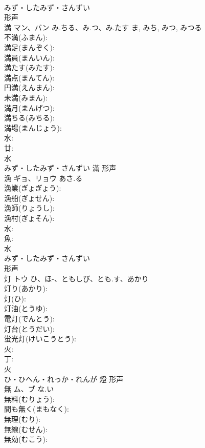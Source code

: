 \documentclass[8pt]{extreport}
\begin{document}
\begin{CJK}{UTF8}{min}
\\	みず・したみず・さんずい	
\\	形声 
\\	満	マン、バン	み.ちる、み.つ、み.たす	ま, みち, みつ, みつる	
\\	不満(ふまん): 
\\	満足(まんぞく): 
\\	満員(まんいん): 
\\	満たす(みたす): 
\\	満点(まんてん): 
\\	円満(えんまん): 
\\	未満(みまん): 
\\	満月(まんげつ): 
\\	満ちる(みちる): 
\\	満場(まんじょう): 
\\	水: 
\\	廿: 
\\	水	
\\	みず・したみず・さんずい	滿	形声 
\\	漁	ギョ、リョウ	あさ.る		
\\	漁業(ぎょぎょう): 
\\	漁船(ぎょせん): 
\\	漁師(りょうし): 
\\	漁村(ぎょそん): 
\\	水: 
\\	魚: 
\\	水	
\\	みず・したみず・さんずい	
\\	形声 
\\	灯	トウ	ひ、ほ-、ともしび、とも.す、あかり		
\\	灯り(あかり): 
\\	灯(ひ): 
\\	灯油(とうゆ): 
\\	電灯(でんとう): 
\\	灯台(とうだい): 
\\	蛍光灯(けいこうとう): 
\\	火: 
\\	丁: 
\\	火	
\\	ひ・ひへん・れっか・れんが	燈	形声 
\\	無	ム、ブ	な.い		
\\	無料(むりょう): 
\\	間も無く(まもなく): 
\\	無理(むり): 
\\	無線(むせん): 
\\	無効(むこう): 

\end{CJK}
\end{document}
